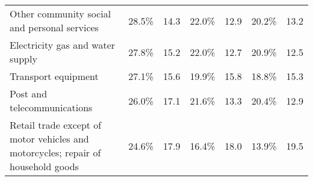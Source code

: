 \documentclass[10pt]{article}
\begin{document}
\begin{table}[!h]
{\begin{tabular}{l|cc|cc|cc}
\rowcolor[HTML]{FFFFFF} 
{\color[HTML]{333333} Other community social and personal services}                                       & {\color[HTML]{333333} 28.5\%}                                             & {\color[HTML]{333333} 14.3}                                          & {\color[HTML]{333333} 22.0\%}                                             & {\color[HTML]{333333} 12.9}                                          & {\color[HTML]{333333} 20.2\%}                                             & {\color[HTML]{333333} 13.2}                                          \\
\rowcolor[HTML]{FFFFFF} 
{\color[HTML]{333333} Electricity gas and water supply}                                                   & {\color[HTML]{333333} 27.8\%}                                             & {\color[HTML]{333333} 15.2}                                          & {\color[HTML]{333333} 22.0\%}                                             & {\color[HTML]{333333} 12.7}                                          & {\color[HTML]{333333} 20.9\%}                                             & {\color[HTML]{333333} 12.5}                                          \\
\rowcolor[HTML]{FFFFFF} 
{\color[HTML]{333333} Transport equipment}                                                                & {\color[HTML]{333333} 27.1\%}                                             & {\color[HTML]{333333} 15.6}                                          & {\color[HTML]{333333} 19.9\%}                                             & {\color[HTML]{333333} 15.8}                                          & {\color[HTML]{333333} 18.8\%}                                             & {\color[HTML]{333333} 15.3}                                          \\
\rowcolor[HTML]{FFFFFF} 
{\color[HTML]{333333} Post and telecommunications}                                                        & {\color[HTML]{333333} 26.0\%}                                             & {\color[HTML]{333333} 17.1}                                          & {\color[HTML]{333333} 21.6\%}                                             & {\color[HTML]{333333} 13.3}                                          & {\color[HTML]{333333} 20.4\%}                                             & {\color[HTML]{333333} 12.9}                                          \\
\rowcolor[HTML]{FFFFFF} 
{\color[HTML]{333333} Retail trade except of motor vehicles and motorcycles; repair of household goods}   & {\color[HTML]{333333} 24.6\%}                                             & {\color[HTML]{333333} 17.9}                                          & {\color[HTML]{333333} 16.4\%}                                             & {\color[HTML]{333333} 18.0}                                          & {\color[HTML]{333333} 13.9\%}                                             & {\color[HTML]{333333} 19.5}                                          \\

\end{tabular}}
\end{table}
\end{document}
